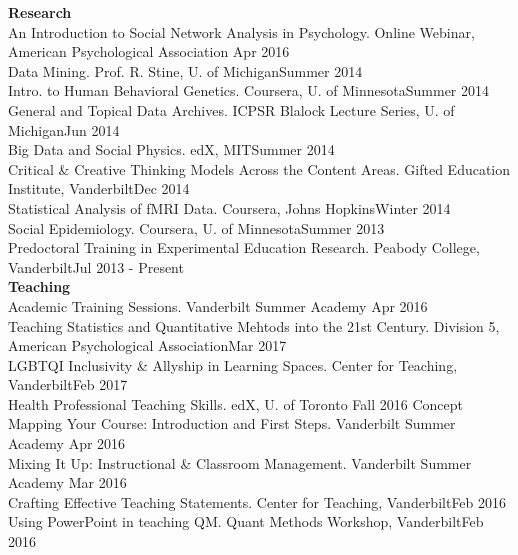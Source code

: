 %
{\large \textbf{Research}}\\
An Introduction to Social Network Analysis in Psychology. Online Webinar, American Psychological Association \hfill{Apr 2016}\smallskip\\
Data Mining. Prof. R. Stine, U. of Michigan\hfill{Summer 2014}\smallskip\\
Intro. to Human Behavioral Genetics. Coursera, U. of Minnesota\hfill{Summer 2014}%
\smallskip\\
General and Topical Data Archives. ICPSR Blalock Lecture Series, U. of Michigan\hfill{Jun 2014}\smallskip\\
Big Data and Social Physics. edX, MIT\hfill{Summer 2014}%
\smallskip\\
Critical \& Creative Thinking Models Across the Content Areas. Gifted Education Institute, Vanderbilt\hfill{Dec 2014}\smallskip\\
Statistical Analysis of fMRI Data. Coursera, Johns Hopkins\hfill{Winter 2014}%
\smallskip\\
Social Epidemiology. Coursera, U. of Minnesota\hfill{Summer 2013}%
\smallskip\\
Predoctoral Training in Experimental Education Research. Peabody College, Vanderbilt\hfill{Jul 2013 - Present}\smallskip\\
%
%
{\large {\bf Teaching}}\\
Academic Training Sessions. Vanderbilt Summer Academy \hfill{Apr 2016}\smallskip\\
Teaching Statistics and Quantitative Mehtods into the 21st Century. Division 5,  American Psychological Association\hfill{Mar 2017}\smallskip\\
LGBTQI Inclusivity & Allyship in Learning Spaces.  Center for Teaching, Vanderbilt\hfill{Feb 2017}\smallskip\\
Health Professional Teaching Skills. edX, U. of Toronto \hfill{Fall 2016}%
Concept Mapping Your Course: Introduction and First Steps. Vanderbilt Summer Academy \hfill{Apr 2016}\smallskip\\
Mixing It Up: Instructional \& Classroom Management. Vanderbilt Summer Academy \hfill{Mar 2016}\smallskip\\
Crafting Effective Teaching Statements. Center for Teaching, Vanderbilt\hfill{Feb 2016}\smallskip\\
Using PowerPoint in teaching QM. Quant Methods Workshop, Vanderbilt\hfill{Feb 2016}\smallskip\\

